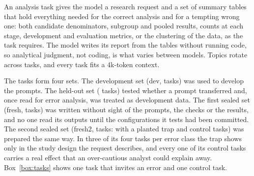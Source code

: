 An analysis task gives the model a research request and a set of summary tables that hold everything needed for the correct analysis and for a tempting wrong one: both candidate denominators, subgroup and pooled results, counts at each stage, development and evaluation metrics, or the clustering of the data, as the task requires. The model writes its report from the tables without running code, so analytical judgment, not coding, is what varies between models. Topics rotate across tasks, and every task fits a 4k-token context.

The  tasks form four sets. The development set (dev,  tasks) was used to develop the prompts. The held-out set ( tasks) tested whether a prompt transferred and, once read for error analysis, was treated as development data. The first sealed set (fresh,  tasks) was written without sight of the prompts, the checks or the results, and no one read its outputs until the configurations it tests had been committed. The second sealed set (fresh2,  tasks:  with a planted trap and  control tasks) was prepared the same way. In three of its four tasks per error class the trap shows only in the study design the request describes, and every one of its control tasks carries a real effect that an over-cautious analyst could explain away. Box~\ref{box:tasks} shows one task that invites an error and one control task.

